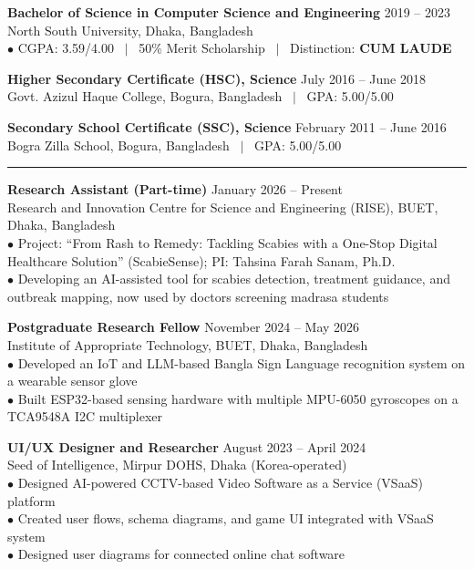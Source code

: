 \documentclass[11pt,a4paper]{article}
\renewcommand{\section}[1]{%
    \par\vspace{6pt}%
    \pagebreak[0]%
    \noindent{\large\bfseries\scshape #1}%
    \vspace{2pt}%
    \hrule%
    \vspace{6pt}%
    \nopagebreak[4]%
}
\begin{document}
\vspace{3pt}
\noindent\textbf{Bachelor of Science in Computer Science and Engineering} \hfill 2019 -- 2023\\
North South University, Dhaka, Bangladesh\\
$\bullet$ CGPA: 3.59/4.00 ~$|$~ 50\% Merit Scholarship ~$|$~ Distinction: \textbf{CUM LAUDE}

\vspace{3pt}
\noindent\textbf{Higher Secondary Certificate (HSC), Science} \hfill July 2016 -- June 2018\\
Govt. Azizul Haque College, Bogura, Bangladesh ~$|$~ GPA: 5.00/5.00

\vspace{3pt}
\noindent\textbf{Secondary School Certificate (SSC), Science} \hfill February 2011 -- June 2016\\
Bogra Zilla School, Bogura, Bangladesh ~$|$~ GPA: 5.00/5.00

\section{Professional Experience}

\noindent\textbf{Research Assistant (Part-time)} \hfill January 2026 -- Present\\
Research and Innovation Centre for Science and Engineering (RISE), BUET, Dhaka, Bangladesh\\
$\bullet$ Project: ``From Rash to Remedy: Tackling Scabies with a One-Stop Digital Healthcare Solution'' (ScabieSense); PI: Tahsina Farah Sanam, Ph.D.\\
$\bullet$ Developing an AI-assisted tool for scabies detection, treatment guidance, and outbreak mapping, now used by doctors screening madrasa students

\vspace{6pt}
\noindent\textbf{Postgraduate Research Fellow} \hfill November 2024 -- May 2026\\
Institute of Appropriate Technology, BUET, Dhaka, Bangladesh\\
$\bullet$ Developed an IoT and LLM-based Bangla Sign Language recognition system on a wearable sensor glove\\
$\bullet$ Built ESP32-based sensing hardware with multiple MPU-6050 gyroscopes on a TCA9548A I2C multiplexer

\vspace{3pt}
\noindent\textbf{UI/UX Designer and Researcher} \hfill August 2023 -- April 2024\\
Seed of Intelligence, Mirpur DOHS, Dhaka (Korea-operated)\\
$\bullet$ Designed AI-powered CCTV-based Video Software as a Service (VSaaS) platform\\
$\bullet$ Created user flows, schema diagrams, and game UI integrated with VSaaS system\\
$\bullet$ Designed user diagrams for connected online chat software
\end{document}
